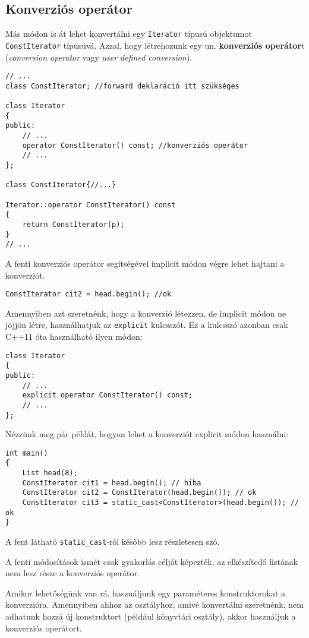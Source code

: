 \documentclass[a4paper,11.5pt,table]{article}
\begin{document}
	\subsection{Konverziós operátor}
	Más módon is át lehet konvertálni egy \texttt{Iterator} típusú objektumot \texttt{ConstIterator} típusúvá. Azzal, hogy létrehozunk egy un. \textbf{konverziós operátor}t (\textit{conversion operator} vagy \textit{user defined conversion}). 
	\begin{lstlisting}
// ...
class ConstIterator; //forward deklaráció itt szükséges

class Iterator
{
public:
	// ...
	operator ConstIterator() const; //konverziós operátor
	// ...
};

class ConstIterator{//...}

Iterator::operator ConstIterator() const
{
	return ConstIterator(p);
}
// ...
	\end{lstlisting}
	A fenti konverziós operátor segítségével implicit módon végre lehet hajtani a konverziót. 
	\begin{lstlisting}
ConstIterator cit2 = head.begin(); //ok
	\end{lstlisting}	
	Amennyiben azt szeretnénk, hogy a konverzió létezzen, de implicit módon ne jöjjön létre, használhatjuk az \texttt{explicit} kulcsszót. Ez a kulcsszó azonban csak C++11 óta használható ilyen módon:
	\begin{lstlisting}
class Iterator
{
public:
	// ...
	explicit operator ConstIterator() const;
	// ...
};
	\end{lstlisting}
	Nézzünk meg pár példát, hogyan lehet a konverziót explicit módon használni:
	\begin{lstlisting}
int main()
{
	List head(8);
	ConstIterator cit1 = head.begin(); // hiba
	ConstIterator cit2 = ConstIterator(head.begin()); // ok
	ConstIterator cit3 = static_cast<ConstIterator>(head.begin()); // ok
}
	\end{lstlisting}
	\begin{note}
		A fent látható \texttt{static\_cast}-ról később lesz részletesen szó.
	\end{note}
	\begin{note}
		A fenti módosítások ismét csak gyakorlás célját képezték, az elkészítedő listának nem lesz része a konverziós operátor.
	\end{note}
	\begin{note}
    Amikor lehetőségünk van rá, használjunk egy paraméteres konstruktorokat a konverzióra. Amennyiben ahhoz az osztályhoz, amivé konvertálni szeretnénk, nem adhatunk hozzá új konstruktort (például könyvtári osztály), akkor használjuk a konverziós operátort. 
	\end{note}
\end{document}

